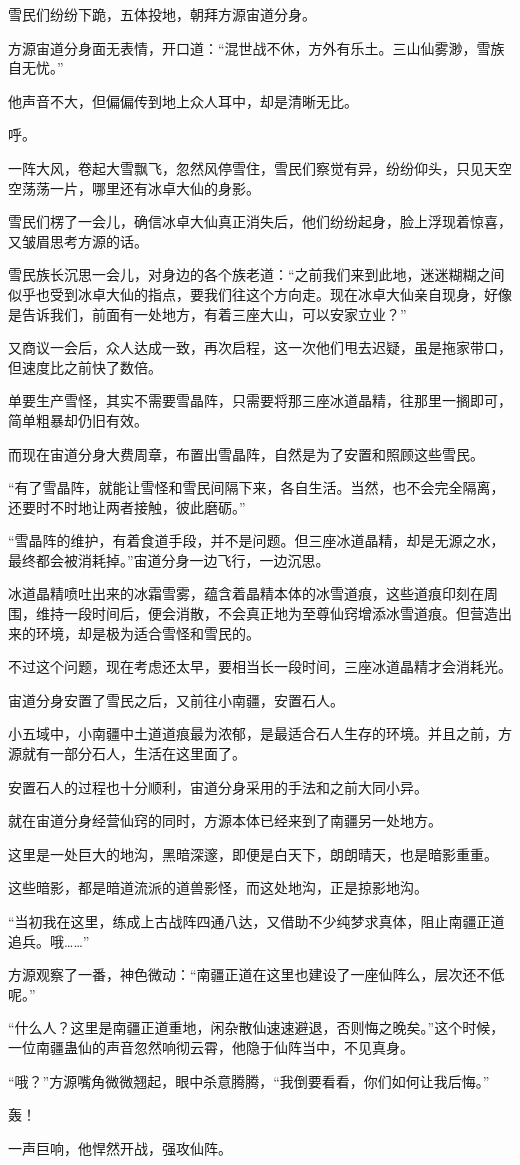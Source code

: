 \begin{this_body}
雪民们纷纷下跪，五体投地，朝拜方源宙道分身。

方源宙道分身面无表情，开口道：“混世战不休，方外有乐土。三山仙雾渺，雪族自无忧。”

他声音不大，但偏偏传到地上众人耳中，却是清晰无比。

呼。

一阵大风，卷起大雪飘飞，忽然风停雪住，雪民们察觉有异，纷纷仰头，只见天空空荡荡一片，哪里还有冰卓大仙的身影。

雪民们楞了一会儿，确信冰卓大仙真正消失后，他们纷纷起身，脸上浮现着惊喜，又皱眉思考方源的话。

雪民族长沉思一会儿，对身边的各个族老道：“之前我们来到此地，迷迷糊糊之间似乎也受到冰卓大仙的指点，要我们往这个方向走。现在冰卓大仙亲自现身，好像是告诉我们，前面有一处地方，有着三座大山，可以安家立业？”

又商议一会后，众人达成一致，再次启程，这一次他们甩去迟疑，虽是拖家带口，但速度比之前快了数倍。

单要生产雪怪，其实不需要雪晶阵，只需要将那三座冰道晶精，往那里一搁即可，简单粗暴却仍旧有效。

而现在宙道分身大费周章，布置出雪晶阵，自然是为了安置和照顾这些雪民。

“有了雪晶阵，就能让雪怪和雪民间隔下来，各自生活。当然，也不会完全隔离，还要时不时地让两者接触，彼此磨砺。”

“雪晶阵的维护，有着食道手段，并不是问题。但三座冰道晶精，却是无源之水，最终都会被消耗掉。”宙道分身一边飞行，一边沉思。

冰道晶精喷吐出来的冰霜雪雾，蕴含着晶精本体的冰雪道痕，这些道痕印刻在周围，维持一段时间后，便会消散，不会真正地为至尊仙窍增添冰雪道痕。但营造出来的环境，却是极为适合雪怪和雪民的。

不过这个问题，现在考虑还太早，要相当长一段时间，三座冰道晶精才会消耗光。

宙道分身安置了雪民之后，又前往小南疆，安置石人。

小五域中，小南疆中土道道痕最为浓郁，是最适合石人生存的环境。并且之前，方源就有一部分石人，生活在这里面了。

安置石人的过程也十分顺利，宙道分身采用的手法和之前大同小异。

就在宙道分身经营仙窍的同时，方源本体已经来到了南疆另一处地方。

这里是一处巨大的地沟，黑暗深邃，即便是白天下，朗朗晴天，也是暗影重重。

这些暗影，都是暗道流派的道兽影怪，而这处地沟，正是掠影地沟。

“当初我在这里，练成上古战阵四通八达，又借助不少纯梦求真体，阻止南疆正道追兵。哦……”

方源观察了一番，神色微动：“南疆正道在这里也建设了一座仙阵么，层次还不低呢。”

“什么人？这里是南疆正道重地，闲杂散仙速速避退，否则悔之晚矣。”这个时候，一位南疆蛊仙的声音忽然响彻云霄，他隐于仙阵当中，不见真身。

“哦？”方源嘴角微微翘起，眼中杀意腾腾，“我倒要看看，你们如何让我后悔。”

轰！

一声巨响，他悍然开战，强攻仙阵。

\end{this_body}

